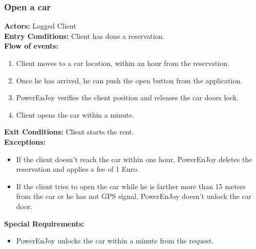 \subsubsection{Open a car}
%
\textbf{Actors:}
Logged Client \\
%
\textbf{Entry Conditions:}
Client has done a reservation. \\
%
\textbf{Flow of events:}
\begin{enumerate}
\item Client moves to a car location, within an hour from the reservation.
\item Once he has arrived, he can push the open button from the application.
\item PowerEnJoy verifies the client position and releases the car doors lock.
\item Client opens the car within a minute.
\end{enumerate}
%
\textbf{Exit Conditions:}
Client starts the rent. \\
%
\textbf{Exceptions:}
\begin{itemize}
\item If the client doesn't reach the car within one hour, PowerEnJoy deletes the reservation and applies a fee of 1 Euro.
\item If the client tries to open the car while he is farther more than 15 meters from the car or he has not GPS signal, PowerEnJoy doesn't unlock the car door.
\end{itemize}
%
\textbf{Special Requirements:}
\begin{itemize}
\item PowerEnJoy unlocks the car within a minute from the request.
\end{itemize}




